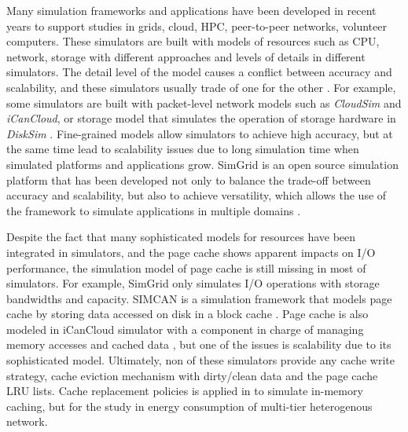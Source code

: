\documentclass[conference]{IEEEtran}
\begin{document}
            Many simulation frameworks and applications have been developed 
            in recent years to support studies in grids, cloud, HPC, peer-to-peer 
            networks, volunteer computers.                     
            These simulators are built with models of resources such as CPU, network, 
            storage with different approaches and levels of details in different simulators. 
            The detail level of the model causes a conflict between accuracy and scalability, 
            and these simulators usually trade of one for the other 
            \cite{casanova2014simgrid}. 
            For example, some simulators are built with packet-level network models 
            such as \textit{CloudSim} and \textit{iCanCloud}, or storage model that 
            simulates the operation of storage hardware in \textit{DiskSim} 
            \cite{casanova2014simgrid}. 
            Fine-grained models allow simulators to achieve high accuracy, 
            but at the same time lead to scalability issues due to long simulation time 
            when simulated platforms and applications grow. 
            SimGrid is an open source simulation platform that has been developed 
            not only to balance the trade-off between accuracy and scalability, 
            but also to achieve versatility, which allows the use of the framework 
            to simulate applications in multiple domains \cite{casanova2014simgrid}.
            
            Despite the fact that many sophisticated models for resources have been 
            integrated in simulators, and the page cache shows apparent impacts on I/O
            performance, the simulation model of page cache is still missing in most 
            of simulators.
            For example, SimGrid only simulates I/O operations with storage bandwidths 
            and capacity. 
            SIMCAN is a simulation framework that models page cache by storing data 
            accessed on disk in a block cache \cite{nunez2012simcan}. 
            Page cache is also modeled in iCanCloud simulator with a component in charge 
            of managing memory accesses and cached data \cite{nunez2012icancloud}, 
            but one of the issues is scalability due to its sophisticated model.
            Ultimately, non of these simulators provide any cache write strategy, 
            cache eviction mechanism with dirty/clean data and the page cache LRU lists. 
            Cache replacement policies is applied in \cite{xu2018saving} to simulate 
            in-memory caching, but for the study in energy consumption of multi-tier 
            heterogenous network.
            
\end{document}

